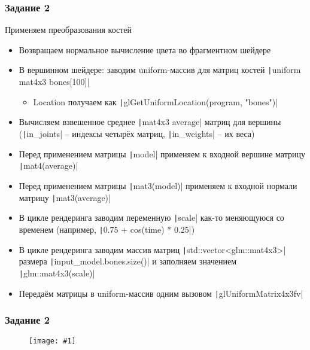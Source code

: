 \documentclass{beamer}
\newcommand{\slideimage}[1]{
  \begin{figure}
    \begin{adjustbox}{width=\textwidth, totalheight=\textheight-2\baselineskip-2\baselineskip,keepaspectratio}
      \texttt{[image: \#1]}
    \end{adjustbox}
  \end{figure}
}
\begin{document}
\begin{frame}[fragile]
\frametitle{Задание 2}
\fontsize{8pt}{8pt}
\selectfont
Применяем преобразования костей
\begin{itemize}
\item Возвращаем нормальное вычисление цвета во фрагментном шейдере
\item В вершинном шейдере: заводим uniform-массив для матриц костей \texttt|uniform mat4x3 bones[100]|
\begin{itemize}
\fontsize{8pt}{8pt}
\selectfont
\item Location получаем как \texttt|glGetUniformLocation(program, "bones")|
\end{itemize}
\item Вычисляем взвешенное среднее \texttt|mat4x3 average| матриц для вершины (\texttt|in_joints| -- индексы четырёх матриц, \texttt|in_weights| -- их веса)
\item Перед применением матрицы \texttt|model| применяем к входной вершине матрицу \texttt|mat4(average)|
\item Перед применением матрицы \texttt|mat3(model)| применяем к входной нормали матрицу \texttt|mat3(average)|
\item В цикле рендеринга заводим переменную \texttt|scale| как-то меняющуюся со временем (например, \texttt|0.75 + cos(time) * 0.25|)
\item В цикле рендеринга заводим массив матриц \texttt|std::vector<glm::mat4x3>| размера \texttt|input_model.bones.size()| и заполняем значением \texttt|glm::mat4x3(scale)|
\item Передаём матрицы в uniform-массив одним вызовом \texttt|glUniformMatrix4x3fv|
\end{itemize}
\end{frame}

\begin{frame}[fragile]
\frametitle{Задание 2}
\slideimage{2.png}
\end{frame}
\end{document}
